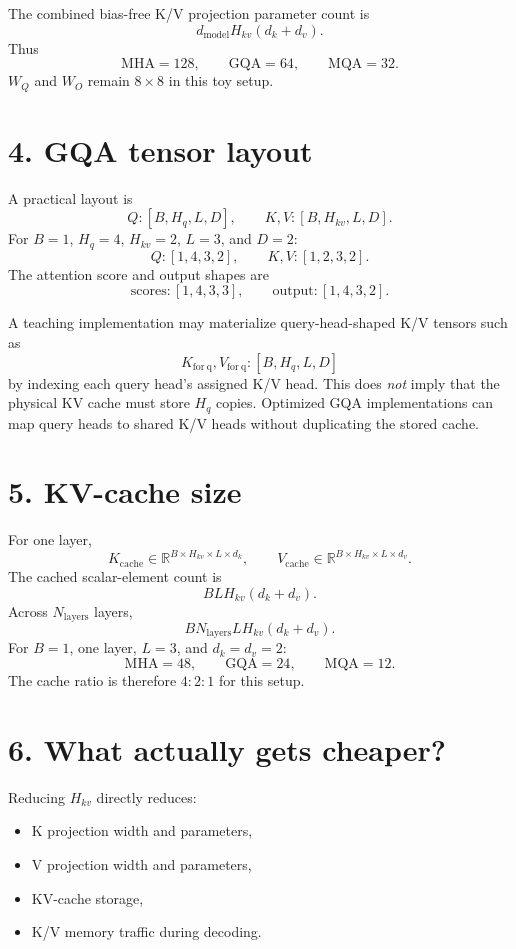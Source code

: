\documentclass[11pt]{article}
\begin{document}
The combined bias-free K/V projection parameter count is
\[
\boxed{d_{\mathrm{model}}H_{kv}(d_k+d_v)}.
\]
Thus
\[
\text{MHA}=128,\qquad
\text{GQA}=64,\qquad
\text{MQA}=32.
\]
$W_Q$ and $W_O$ remain $8\times8$ in this toy setup.

\section*{4. GQA tensor layout}

A practical layout is
\[
Q:[B,H_q,L,D],
\qquad
K,V:[B,H_{kv},L,D].
\]
For $B=1$, $H_q=4$, $H_{kv}=2$, $L=3$, and $D=2$:
\[
Q:[1,4,3,2],
\qquad
K,V:[1,2,3,2].
\]
The attention score and output shapes are
\[
\text{scores}:[1,4,3,3],
\qquad
\text{output}:[1,4,3,2].
\]

A teaching implementation may materialize query-head-shaped K/V tensors such as
\[
K_{\mathrm{for\ q}},V_{\mathrm{for\ q}}:[B,H_q,L,D]
\]
by indexing each query head's assigned K/V head. This does \emph{not} imply that the physical KV cache must store $H_q$ copies. Optimized GQA implementations can map query heads to shared K/V heads without duplicating the stored cache.

\section*{5. KV-cache size}

For one layer,
\[
K_{\mathrm{cache}}\in\mathbb{R}^{B\times H_{kv}\times L\times d_k},
\qquad
V_{\mathrm{cache}}\in\mathbb{R}^{B\times H_{kv}\times L\times d_v}.
\]
The cached scalar-element count is
\[
\boxed{BLH_{kv}(d_k+d_v)}.
\]
Across $N_{\mathrm{layers}}$ layers,
\[
\boxed{BN_{\mathrm{layers}}LH_{kv}(d_k+d_v)}.
\]
For $B=1$, one layer, $L=3$, and $d_k=d_v=2$:
\[
\text{MHA}=48,\qquad
\text{GQA}=24,\qquad
\text{MQA}=12.
\]
The cache ratio is therefore $4:2:1$ for this setup.

\section*{6. What actually gets cheaper?}

Reducing $H_{kv}$ directly reduces:
\begin{itemize}
    \item K projection width and parameters,
    \item V projection width and parameters,
    \item KV-cache storage,
    \item K/V memory traffic during decoding.
\end{itemize}
\end{document}
